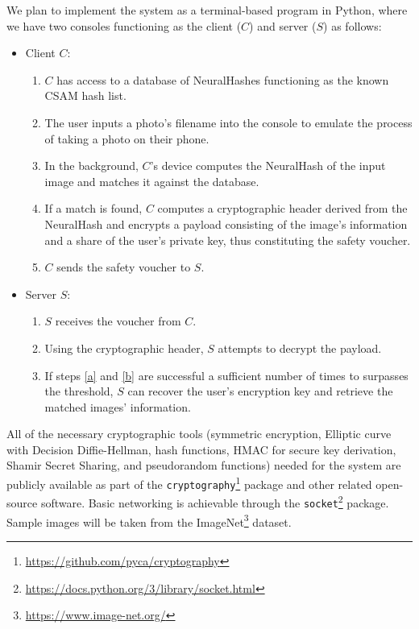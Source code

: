 We plan to implement the system as a terminal-based program in Python, where we have two consoles functioning as the client ($C$) and server ($S$) as follows:
\begin{itemize}
	\item Client $C$:
	\begin{enumerate}
		\item $C$ has access to a database of NeuralHashes functioning as the known CSAM hash list.
		\item The user inputs a photo's filename  into the console to emulate the process of taking a photo on their phone.
		\item In the background, $C$'s device computes the NeuralHash of the input image and matches it against the database.
		\item If a match is found, $C$ computes a cryptographic header derived from the NeuralHash and encrypts a payload consisting of the image's information and a share of the user's private key, thus constituting the safety voucher.
		\item $C$ sends the safety voucher to $S$.
	\end{enumerate}
	\item Server $S$:
	\begin{enumerate}[resume]
		\item \label{a} $S$ receives the voucher from $C$.
		\item \label{b} Using the cryptographic header, $S$ attempts to decrypt the payload.
		\item If steps \ref{a} and \ref{b} are successful a sufficient number of times to surpasses the threshold, $S$ can recover the user's encryption key and retrieve the matched images' information.
	\end{enumerate}
\end{itemize}
All of the necessary cryptographic tools (symmetric encryption, Elliptic curve with Decision Diffie-Hellman, hash functions, HMAC for secure key derivation, Shamir Secret Sharing, and pseudorandom functions) needed for the system are publicly available as part of the \texttt{cryptography}\footnote{\url{https://github.com/pyca/cryptography}} package and other related open-source software. Basic networking is achievable through the \texttt{socket}\footnote{\url{https://docs.python.org/3/library/socket.html}} package. Sample images will be taken from the ImageNet\footnote{\url{https://www.image-net.org/}} dataset.